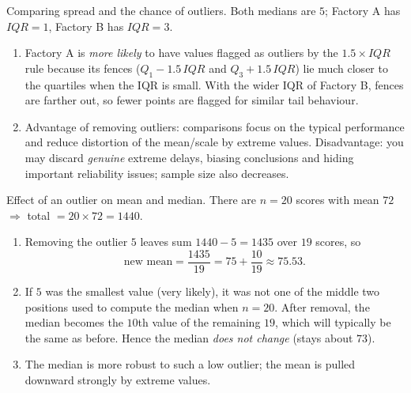 \documentclass[11pt]{article}
\def\textbf#1{#1}%
\def\mathrm#1{#1}%
\begin{document}

\begin{solution}
\textbf{Comparing spread and the chance of outliers.}
Both medians are $5$; Factory A has $\mathrm{IQR}=1$, Factory B has $\mathrm{IQR}=3$.
\begin{enumerate}
  \item \textbf{Factory A} is \emph{more likely} to have values flagged as outliers by the $1.5\times\mathrm{IQR}$ rule because its fences ($Q_1\!-\!1.5\,\mathrm{IQR}$ and $Q_3\!+\!1.5\,\mathrm{IQR}$) lie much closer to the quartiles when the IQR is small. With the wider IQR of Factory B, fences are farther out, so fewer points are flagged for similar tail behaviour.
  \item Advantage of removing outliers: comparisons focus on the typical performance and reduce distortion of the mean/scale by extreme values.  
        Disadvantage: you may discard \emph{genuine} extreme delays, biasing conclusions and hiding important reliability issues; sample size also decreases.
\end{enumerate}
\end{solution}


\begin{solution}
\textbf{Effect of an outlier on mean and median.}
There are $n=20$ scores with mean $72$ $\Rightarrow$ total $=20\times72=1440$.
\begin{enumerate}
  \item Removing the outlier $5$ leaves sum $1440-5=1435$ over $19$ scores, so
  \[
  \text{new mean}=\frac{1435}{19}=75+\frac{10}{19}\approx \boxed{75.53}.
  \]
  \item If $5$ was the smallest value (very likely), it was not one of the middle two positions used to compute the median when $n=20$. After removal, the median becomes the $10$th value of the remaining $19$, which will typically be the same as before. Hence the median \emph{does not change} (stays about $73$).
  \item The \textbf{median} is more robust to such a low outlier; the mean is pulled downward strongly by extreme values.
\end{enumerate}
\end{solution}

\end{document}
